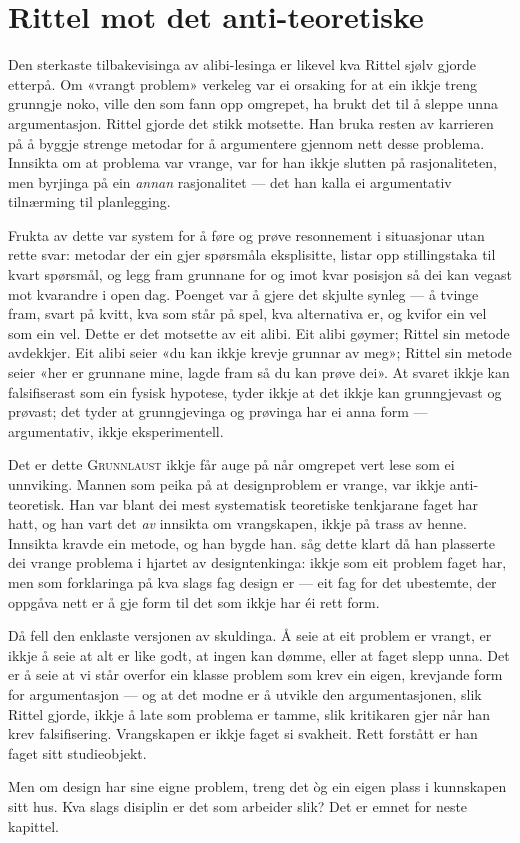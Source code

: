 \section{Rittel mot det anti-teoretiske}

Den sterkaste tilbakevisinga av alibi-lesinga er likevel kva Rittel sjølv gjorde etterpå. Om «vrangt problem» verkeleg var ei orsaking for at ein ikkje treng grunngje noko, ville den som fann opp omgrepet, ha brukt det til å sleppe unna argumentasjon. Rittel gjorde det stikk motsette. Han bruka resten av karrieren på å byggje strenge metodar for å argumentere gjennom nett desse problema. Innsikta om at problema var vrange, var for han ikkje slutten på rasjonaliteten, men byrjinga på ein \emph{annan} rasjonalitet — det han kalla ei argumentativ tilnærming til planlegging.

Frukta av dette var system for å føre og prøve resonnement i situasjonar utan rette svar: metodar der ein gjer spørsmåla eksplisitte, listar opp stillingstaka til kvart spørsmål, og legg fram grunnane for og imot kvar posisjon så dei kan vegast mot kvarandre i open dag. Poenget var å gjere det skjulte synleg — å tvinge fram, svart på kvitt, kva som står på spel, kva alternativa er, og kvifor ein vel som ein vel. Dette er det motsette av eit alibi. Eit alibi gøymer; Rittel sin metode avdekkjer. Eit alibi seier «du kan ikkje krevje grunnar av meg»; Rittel sin metode seier «her er grunnane mine, lagde fram så du kan prøve dei». At svaret ikkje kan falsifiserast som ein fysisk hypotese, tyder ikkje at det ikkje kan grunngjevast og prøvast; det tyder at grunngjevinga og prøvinga har ei anna form — argumentativ, ikkje eksperimentell.

Det er dette \textsc{Grunnlaust} ikkje får auge på når omgrepet vert lese som ei unnviking. Mannen som peika på at designproblem er vrange, var ikkje anti-teoretisk. Han var blant dei mest systematisk teoretiske tenkjarane faget har hatt, og han vart det \emph{av} innsikta om vrangskapen, ikkje på trass av henne. Innsikta kravde ein metode, og han bygde han. \textcite{buchanan1992wicked} såg dette klart då han plasserte dei vrange problema i hjartet av designtenkinga: ikkje som eit problem faget har, men som forklaringa på kva slags fag design er — eit fag for det ubestemte, der oppgåva nett er å gje form til det som ikkje har éi rett form.

Då fell den enklaste versjonen av skuldinga. Å seie at eit problem er vrangt, er ikkje å seie at alt er like godt, at ingen kan dømme, eller at faget slepp unna. Det er å seie at vi står overfor ein klasse problem som krev ein eigen, krevjande form for argumentasjon — og at det modne er å utvikle den argumentasjonen, slik Rittel gjorde, ikkje å late som problema er tamme, slik kritikaren gjer når han krev falsifisering. Vrangskapen er ikkje faget si svakheit. Rett forstått er han faget sitt studieobjekt.

\vignett

Men om design har sine eigne problem, treng det òg ein eigen plass i kunnskapen sitt hus. Kva slags disiplin er det som arbeider slik? Det er emnet for neste kapittel.

